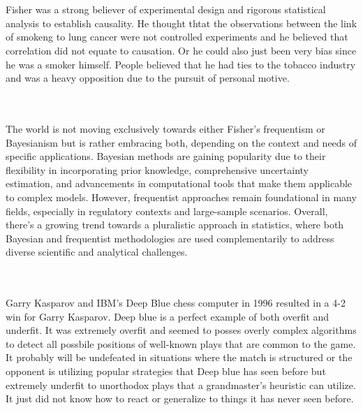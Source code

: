 \documentclass[12pt]{article}
\begin{document}
\begin{enumerate}
 \\ \\ 

Fisher was a strong believer of experimental design and rigorous statistical analysis to establish causality.  He thought thtat the observations between the link of smokeng to lung cancer were not controlled experiments and he believed that correlation did not equate to causation. Or he could also just been very bias since he was a smoker himself. People believed that he had ties to the tobacco industry and was a heavy opposition due to the pursuit of personal motive.

 \\ \\ The world is not moving exclusively towards either Fisher's frequentism or Bayesianism but is rather embracing both, depending on the context and needs of specific applications. Bayesian methods are gaining popularity due to their flexibility in incorporating prior knowledge, comprehensive uncertainty estimation, and advancements in computational tools that make them applicable to complex models. However, frequentist approaches remain foundational in many fields, especially in regulatory contexts and large-sample scenarios. Overall, there's a growing trend towards a pluralistic approach in statistics, where both Bayesian and frequentist methodologies are used complementarily to address diverse scientific and analytical challenges.

 

 \\ \\ 
Garry Kasparov and IBM's Deep Blue chess computer in 1996 resulted in a 4-2 win for Garry Kasparov. Deep blue is a perfect example of both overfit and underfit. It was extremely overfit and seemed to posses overly complex algorithms to detect all possbile positions of well-known plays that are common to the game. It probably will be undefeated in situations where the match is structured or the opponent is utilizing popular strategies that Deep blue has seen before but extremely underfit to unorthodox plays that a grandmaster's heuristic can utilize. It just did not know how to react or generalize to things it has never seen before. 


\end{enumerate}
\end{document}
